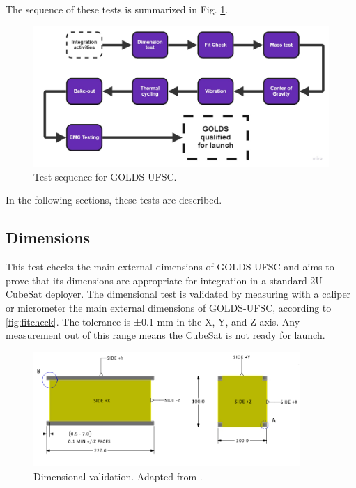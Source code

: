 The sequence of these tests is summarized in Fig. \ref{fig:testesequency}.

\begin{figure}[!htb]
\centering
\includegraphics[scale=0.3]{figures/Tests chart.pdf}
\caption{Test sequence for GOLDS-UFSC.}
\label{fig:testesequency}
\end{figure}

In the following sections, these tests are described.


\subsection{Dimensions}

This test checks the main external dimensions of GOLDS-UFSC and aims to prove that its dimensions are appropriate for integration in a standard 2U CubeSat deployer. The dimensional test is validated by measuring with a caliper or micrometer the main external dimensions of GOLDS-UFSC, according to \autoref{fig:fitcheck}. The tolerance is ±0.1 mm in the X, Y, and Z axis. Any measurement out of this range means the CubeSat is not ready for launch.

\begin{figure}[!htb]
    \begin{center}
        \includegraphics[width=0.9\textwidth]{figures/fit check.png}
        \caption{Dimensional validation. Adapted from \cite{cds}.}
        \label{fig:fitcheck}
    \end{center}
\end{figure}

